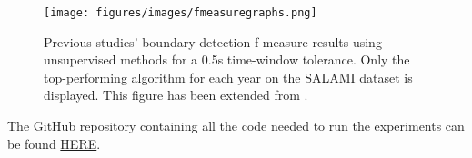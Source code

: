 
\begin{figure}
    \centering
    \texttt{[image: figures/images/fmeasuregraphs.png]}
    \caption[Baseline. State-of-the-art graph.]{Previous studies' boundary detection f-measure results using unsupervised methods for a 0.5s time-window tolerance. Only the top-performing algorithm for each year on the SALAMI dataset is displayed. This figure has been extended from \cite{Hernandez-Olivan2021MusicFeatures}.}
    \label{fig:enter-label}
\end{figure}



The GitHub repository containing all the code needed to run the experiments can be found \href{https://github.com/oriolcolomefont/Master-Thesis.git}{HERE}.


